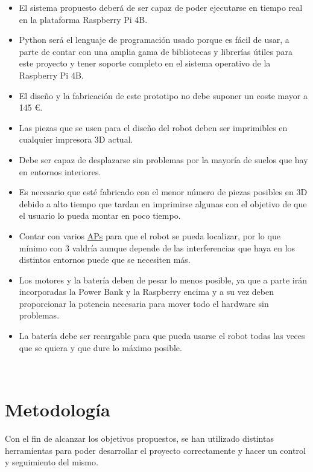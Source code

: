 \begin{itemize}
 \item \textit{} El sistema propuesto deberá de ser capaz de poder ejecutarse en tiempo real en la plataforma Raspberry Pi 4B.
 \item \textit{} Python será el lenguaje de programación usado porque es fácil de usar, a parte de contar con una amplia gama de bibliotecas 
 y librerías útiles para este proyecto y tener soporte completo en el sistema operativo de la Raspberry Pi 4B.
 \item \textit{} El diseño y la fabricación de este prototipo no debe suponer un coste mayor a 145 \euro.
 \item \textit{} Las piezas que se usen para el diseño del robot deben ser imprimibles en cualquier impresora 3D actual.
 \item \textit{} Debe ser capaz de desplazarse sin problemas por la mayoría de suelos que hay en entornos interiores.
 \item \textit{} Es necesario que esté fabricado con el menor número de piezas posibles en 3D debido a alto tiempo que tardan en imprimirse algunas
 con el objetivo de que el usuario lo pueda montar en poco tiempo.
 \item \textit{} Contar con varios \hyperlink{APs}{APs} para que el robot se pueda localizar, por lo que mínimo con 3 valdría aunque depende de las interferencias que haya en los distintos entornos puede que se necesiten más.
 \item \textit{} Los motores y la batería deben de pesar lo menos posible, ya que a parte irán incorporadas la Power Bank y la Raspberry encima y a su vez deben proporcionar la potencia necesaria para mover todo el hardware sin problemas.
 \item \textit{} La batería debe ser recargable para que pueda usarse el robot todas las veces que se quiera y que dure lo máximo posible.
 
\end{itemize}\

 
\section{Metodología}
\label{sec:metodologia}

Con el fin de alcanzar los objetivos propuestos, se han utilizado distintas herramientas para poder desarrollar el proyecto correctamente y
hacer un control y seguimiento del mismo.\\

